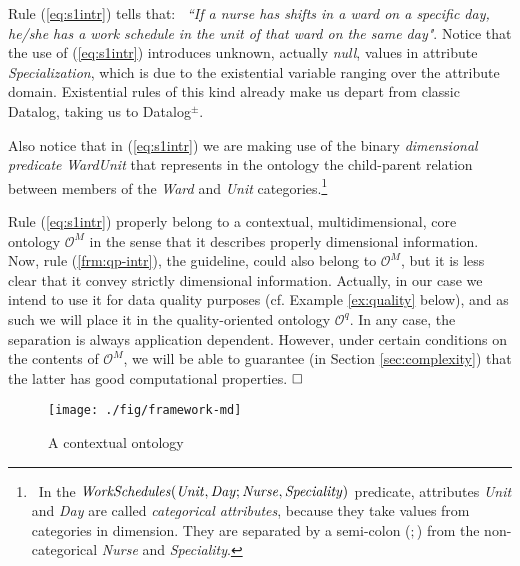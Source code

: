 \documentclass[format=acmsmall, review=false, screen=true]{acmart}
\newcommand{\boxtheorem}{\ensuremath{\hfill \Box}}
\newcommand{\mc}[1]{\mathcal{ #1}}
\newcommand{\nit}[1]{{\it #1}}
\newcommand{\dpm}{{Datalog}$^\pm$}
\begin{document}
\begin{example}
Rule (\ref{eq:s1intr}) tells that: \ {\em ``If a nurse has shifts in a ward on a specific day, he/she has a work schedule in the unit of that ward on the same day"}. Notice that the use of
(\ref{eq:s1intr}) introduces unknown, actually {\em null}, values in attribute \nit{Specialization}, which is due to the existential variable ranging over the attribute domain. Existential rules of this kind already make us depart from classic Datalog, taking us to \dpm.

 Also notice that in (\ref{eq:s1intr}) we are making use of the binary {\em dimensional predicate} \nit{WardUnit} that represents in the ontology the child-parent relation between members of the \nit{Ward} and \nit{Unit} categories.\footnote{\ In the
$\nit{WorkSchedules(Unit,Day;Nurse,Speciality)}$ predicate, attributes \nit{Unit} and \nit{Day} are called {\em categorical attributes}, because they take values from categories in dimension.
They are separated by a semi-colon ($;$) from the non-categorical \nit{Nurse} and \nit{Speciality}.}

Rule (\ref{eq:s1intr}) properly belong to a contextual, multidimensional, core ontology $\mc{O}^M$ in the sense that it describes properly dimensional information. Now, rule (\ref{frm:qp-intr}), the guideline, could also belong to $\mc{O}^M$, but it is less clear that it convey strictly dimensional information. Actually, in our case we intend to use it for data quality purposes (cf. Example
\ref{ex:quality} below), and as such we will place it in the quality-oriented ontology $\mc{O}^q$. In any case, the separation is always application dependent. However, under certain conditions on the contents of $\mc{O}^M$, we will be able to guarantee (in Section \ref{sec:complexity}) that the latter has good computational properties. \boxtheorem
\end{example}



\begin{figure}[ht]
\vspace{-5mm}
\begin{center}
\texttt{[image: ./fig/framework-md]}
\vspace{-5mm}
\caption{A  contextual ontology}
\label{fig:frm}
\end{center}
\vspace{-5mm}
\end{figure}
\end{document}
